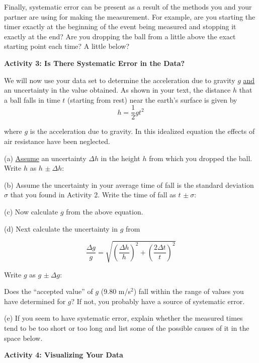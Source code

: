 Finally, systematic error can be present as a result of the methods you and
your partner are using for making the measurement. For example, are you starting
the timer exactly at the beginning of the event being measured and stopping
it exactly at the end? Are you dropping the ball from a little above the exact
starting point each time? A little below?

\textbf{Activity 3: Is There Systematic Error in the Data? }

We will now use your data set to determine the acceleration due to gravity $g$ 
\underline{and} an uncertainty in the value obtained. As shown in your text, 
the distance $h$ that a ball falls in time $t$ (starting from rest) near the 
earth's surface is given by
\[
h=\frac{1}{2}gt^{2}\]


where $g$ is the acceleration due to gravity. In this idealized equation the 
effects of air resistance have been neglected. 

(a) \underline{Assume} an uncertainty \(\Delta h\) in the height $h$ from 
which you dropped the ball. 
Write $h$ as $h$ \(\pm\ \Delta h\):
\vspace{5mm}

(b) Assume the uncertainty in your average time of fall is the standard 
deviation \( \sigma  \) that you found in Activity 2. Write the time of fall 
as $t$ \(\pm\ \sigma  \):
\vspace{5mm}

(c) Now calculate $g$ from the above equation.
\vspace{15mm}

(d) Next calculate the uncertainty in $g$ from

$$
\frac{\Delta g}{g} = \sqrt{\left(\frac{\Delta h}{h}\right)^2 + \left(\frac{2\Delta t}{t}\right)^2}
$$
\vspace{15mm}

Write $g$ as $g$ \(\pm\ \Delta g\):

Does the ``accepted value'' of $g$ (9.80 m/s$^2$) fall within the range of 
values you have determined for $g$? If not, you probably have a source of 
systematic error.

(e) If you seem to have systematic error, explain whether the measured times
tend to be too short or too long and list some of the possible causes of it
in the space below.
\vspace{30mm}

\textbf{Activity 4: Visualizing Your Data}

